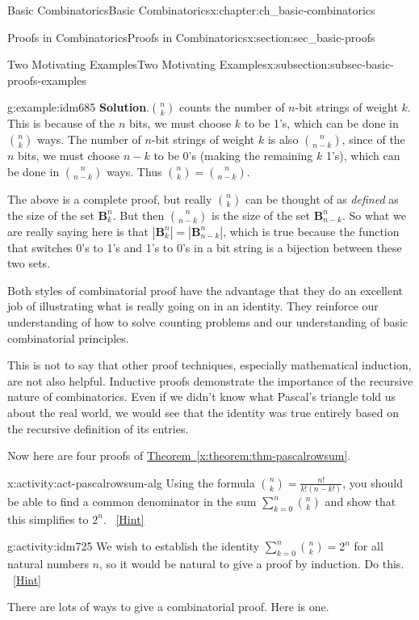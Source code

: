 \documentclass[oneside,10pt,]{book}
\numberwithin{equation}{chapter}
\def\B{\mathbf{B}}
\begin{document}
\begin{chapterptx}{Basic Combinatorics}{}{Basic Combinatorics}{}{}{x:chapter:ch_basic-combinatorics}
\begin{sectionptx}{Proofs in Combinatorics}{}{Proofs in Combinatorics}{}{}{x:section:sec_basic-proofs}
\begin{subsectionptx}{Two Motivating Examples}{}{Two Motivating Examples}{}{}{x:subsection:subsec-basic-proofs-examples}
\begin{example}{}{g:example:idm685}
\noindent\textbf{Solution}.\hypertarget{g:solution:idm689}{}\quad{}\(\binom{n}{k}\) counts the number of \(n\)-bit strings of weight \(k\).  This is because of the \(n\) bits, we must choose \(k\) to be 1's, which can be done in \(\binom{n}{k}\) ways.  The number of \(n\)-bit strings of weight \(k\) is also \(\binom{n}{n-k}\), since of the \(n\) bits, we must choose \(n-k\) to be 0's (making the remaining \(k\) 1's), which can be done in \(\binom{n}{n-k}\) ways.  Thus \(\binom{n}{k} = \binom{n}{n-k}\).%
\par
The above is a complete proof, but really \(\binom{n}{k}\) can be thought of as \emph{defined} as the size of the set \(\B^n_k\).  But then \(\binom{n}{n-k}\) is the size of the set \(\B^n_{n-k}\).  So what we are really saying here is that \(|\B^n_k| = |\B^n_{n-k}|\), which is true because the function that switches 0's to 1's and 1's to 0's in a bit string is a bijection between these two sets.%
\end{example}
Both styles of combinatorial proof have the advantage that they do an excellent job of illustrating what is really going on in an identity.  They reinforce our understanding of how to solve counting problems and our understanding of basic combinatorial principles.%
\par
This is not to say that other proof techniques, especially mathematical induction, are not also helpful.  Inductive proofs demonstrate the importance of the recursive nature of combinatorics.  Even if we didn't know what Pascal's triangle told us about the real world, we would see that the identity was true entirely based on the recursive definition of its entries.%
\par
Now here are four proofs of \hyperref[x:theorem:thm-pascalrowsum]{Theorem~\ref{x:theorem:thm-pascalrowsum}}.%
\begin{activity}{}{x:activity:act-pascalrowsum-alg}%
Using the formula \(\binom{n}{k} = \frac{n!}{k!(n-k!)}\), you should be able to find a common denominator in the sum \(\sum_{k=0}^n \binom{n}{k}\) and show that this simplifies to \(2^n\).%
\qquad~\hfill{\tiny\hyperlink{g:hint:idm722-back}{[Hint]}}\end{activity}
\begin{activity}{}{g:activity:idm725}%
We wish to establish the identity \(\sum_{k=0}^n \binom{n}{k} = 2^n\) for all natural numbers \(n\), so it would be natural to give a proof by induction.  Do this.%
\qquad~\hfill{\tiny\hyperlink{g:hint:idm730-back}{[Hint]}}\end{activity}
There are lots of ways to give a combinatorial proof.  Here is one.%

\end{subsectionptx}
\end{sectionptx}
\end{chapterptx}
\end{document}
